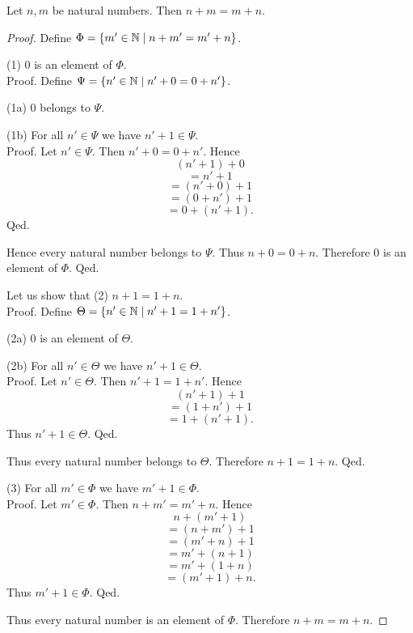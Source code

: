 \documentclass[10pt]{article}
\begin{document}
  \begin{forthel}
    \begin{proposition}[id=ARITHMETIC_03_4029553232052224,printid]
      Let $n, m$ be natural numbers.
      Then $n + m = m + n$.
    \end{proposition}
    \begin{proof}
      Define $\Phi = \{ m' \in \mathbb{N} \mid n + m' = m' + n \}$.

      (1) $0$ is an element of $\Phi$. \\
      Proof.
        Define $\Psi = \{ n' \in \mathbb{N} \mid n' + 0 = 0 + n' \}$.

        (1a) $0$ belongs to $\Psi$.

        (1b) For all $n' \in \Psi$ we have $n' + 1 \in \Psi$. \\
        Proof.
          Let $n' \in \Psi$.
          Then $n' + 0 = 0 + n'$.
          Hence
          \[  (n' + 1) + 0        \]
          \[    = n' + 1          \]
          \[    = (n' + 0) + 1    \]
          \[    = (0 + n') + 1    \]
          \[    = 0 + (n' + 1).   \]
        Qed.

        Hence every natural number belongs to $\Psi$.
        Thus $n + 0 = 0 + n$.
        Therefore $0$ is an element of $\Phi$.
      Qed.

      Let us show that (2) $n + 1 = 1 + n$. \\
      Proof.
        Define $\Theta = \{ n' \in \mathbb{N} \mid n' + 1 = 1 + n' \}$.

        (2a) $0$ is an element of $\Theta$.

        (2b) For all $n' \in \Theta$ we have $n' + 1 \in \Theta$. \\
        Proof.
          Let $n' \in \Theta$.
          Then $n' + 1 = 1 + n'$.
          Hence
          \[  (n' + 1) + 1        \]
          \[    = (1 + n') + 1    \]
          \[    = 1 + (n' + 1).   \]
          Thus $n' + 1 \in \Theta$.
        Qed.

        Thus every natural number belongs to $\Theta$.
        Therefore $n + 1 = 1 + n$.
      Qed.

      (3) For all $m' \in \Phi$ we have $m' + 1 \in \Phi$. \\
      Proof.
        Let $m' \in \Phi$.
        Then $n + m' = m' + n$.
        Hence
        \[  n + (m'  + 1)       \]
        \[    = (n + m') + 1    \]
        \[    = (m' + n) + 1    \]
        \[    = m' + (n + 1)    \]
        \[    = m' + (1 + n)    \]
        \[    = (m' + 1) + n.   \]
        Thus $m' + 1 \in \Phi$.
      Qed.

      Thus every natural number is an element of $\Phi$.
      Therefore $n + m = m + n$.
    \end{proof}
  \end{forthel}
\end{document}

